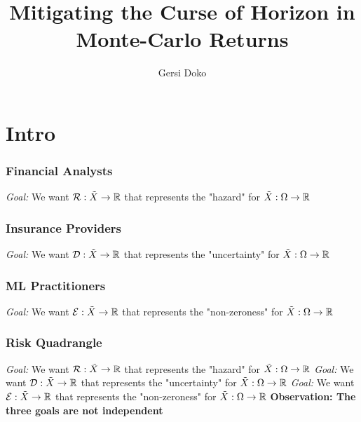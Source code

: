 \documentclass{beamer}
\title{Mitigating the Curse of Horizon in Monte-Carlo Returns}
\author{Gersi Doko}
\institute{Department of Computer Science \\ University of New Hampshire}
\date{}
\begin{document}
\frame{\titlepage}

\section*{Intro}

\begin{frame}
\frametitle{Financial Analysts}
  \vfill
  \emph{Goal: }We want $\mathcal{R} : \tilde{X} \to \mathbb{R}$ that represents the "hazard" for $\tilde{X} : \Omega \to \mathbb{R}$
  \vfill
\end{frame}

\begin{frame}
\frametitle{Insurance Providers}
  \vfill
  \emph{Goal: }We want $\mathcal{D} : \tilde{X} \to \mathbb{R}$ that represents the "uncertainty" for $\tilde{X} : \Omega \to \mathbb{R}$
  \vfill
\end{frame}

\begin{frame}
\frametitle{ML Practitioners}
  \vfill
  \emph{Goal: }We want $\mathcal{E} : \tilde{X} \to \mathbb{R}$ that represents the "non-zeroness" for $\tilde{X} : \Omega \to \mathbb{R}$
  \vfill
\end{frame}

\begin{frame}
\frametitle{Risk Quadrangle}
  \vfill
  \emph{Goal: }We want $\mathcal{R} : \tilde{X} \to \mathbb{R}$ that represents the "hazard" for $\tilde{X} : \Omega \to \mathbb{R}$
  \vfill
  \emph{Goal: }We want $\mathcal{D} : \tilde{X} \to \mathbb{R}$ that represents the "uncertainty" for $\tilde{X} : \Omega \to \mathbb{R}$
  \vfill
  \emph{Goal: }We want $\mathcal{E} : \tilde{X} \to \mathbb{R}$ that represents the "non-zeroness" for $\tilde{X} : \Omega \to \mathbb{R}$
  \vfill
  \textbf{Observation:  The three goals are not independent}
\end{frame}
\end{document}
